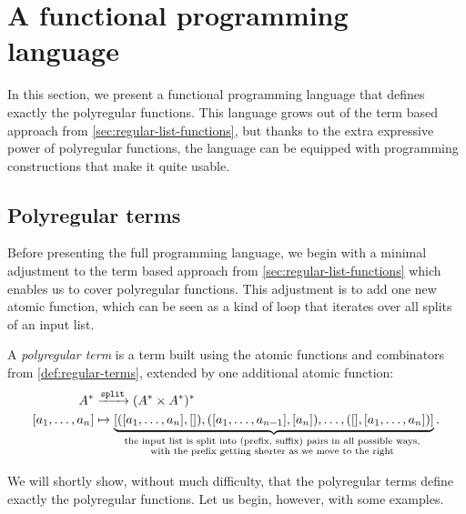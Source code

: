 \section{A functional programming language}
\label{sec:higher-order}



In this section, we present a functional programming language that defines exactly the polyregular functions. This language grows out of the term based approach from \cref{sec:regular-list-functions}, but thanks to the extra expressive power of polyregular functions, the language can be equipped with programming constructions that make it quite usable.

\subsection{Polyregular terms}
\label{sec:polyregular-terms}
Before presenting the full programming language, we begin with a minimal adjustment to the term based approach from \cref{sec:regular-list-functions} which enables us to cover polyregular functions. This adjustment  is to add one new atomic function, which can be  seen as a kind of loop that iterates over all splits of an input list.

\begin{definition}\label{def:polyregular-terms}
    A \emph{polyregular term} is a term built using the atomic functions and combinators from \cref{def:regular-terms}, extended by one additional atomic function:
    \begin{align*}
    A^*  & \xrightarrow{\splitterm} (A^* \times A^*)^* \\
    [a_1,\ldots,a_n] & \mapsto \myunderbrace{[([a_1,\ldots,a_{n}],[]),  ([a_1,\ldots,a_{n-1}],[a_n]), \ldots , ([],[a_1,\ldots,a_{n}])]}{the input list is split into (prefix, suffix) pairs in all possible ways, \\ with the prefix getting shorter as we move to the right}.
\end{align*}
\end{definition}

We will shortly show, without much difficulty, that the polyregular terms define exactly the polyregular functions. Let us begin, however, with some examples.

